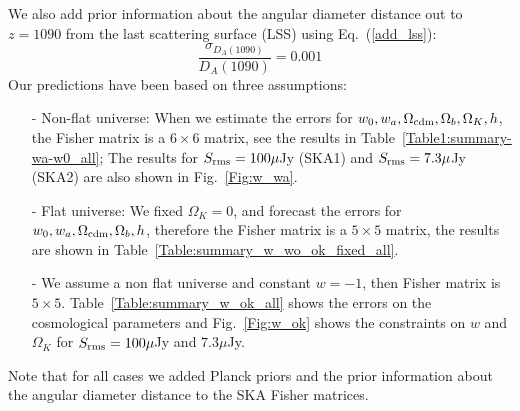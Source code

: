 \documentclass[useAMS,usenatbib]{mn2e}
\begin{document}
We also add prior information about the
angular diameter distance out to $z=1090$  from the last scattering surface (LSS) using Eq.~(\ref{add_lss}):
\begin{equation}
\frac{\sigma_{D_A(1090)}}{D_A(1090)}= 0.001
\end{equation}
Our predictions have been based on three assumptions: 
\begin{itemize}
\item[-] Non-flat universe: When we  estimate the errors for $w_0, w_a, \Omega_{{\rm cdm}}, \Omega_b, \Omega_K, h$, the Fisher matrix  is a $6\times 6$ matrix, see the results in Table~\ref{Table1:summary-wa-w0_all}; The results  for $ S_{\rm rms} = 100 \mu $Jy (SKA1)  and $ S_{\rm rms} = 7.3 \mu $Jy (SKA2) are also shown in Fig.~\ref{Fig:w_wa}.
\item[-] Flat universe: We fixed $\Omega_K=0$, and forecast the errors for $w_0, w_a, \Omega_{{\rm cdm}}, \Omega_b, h$, therefore  the Fisher matrix is a $5 \times 5$ matrix, the results are shown in  Table~\ref{Table:summary_w_wo_ok_fixed_all}.
\item[-] We assume a non flat universe and constant $w=-1$,  then Fisher matrix is $5 \times 5$. Table~\ref{Table:summary_w_ok_all}  shows the errors on the cosmological parameters and Fig.~\ref{Fig:w_ok} shows the constraints on $w$ and $\Omega_K$ for $S_{{\rm rms}}= 100 \mu$Jy and $7.3 \mu$Jy.
\end{itemize}
 Note that for all cases  we added Planck priors and the prior information about the angular diameter distance  to the SKA Fisher matrices.
\end{document}
